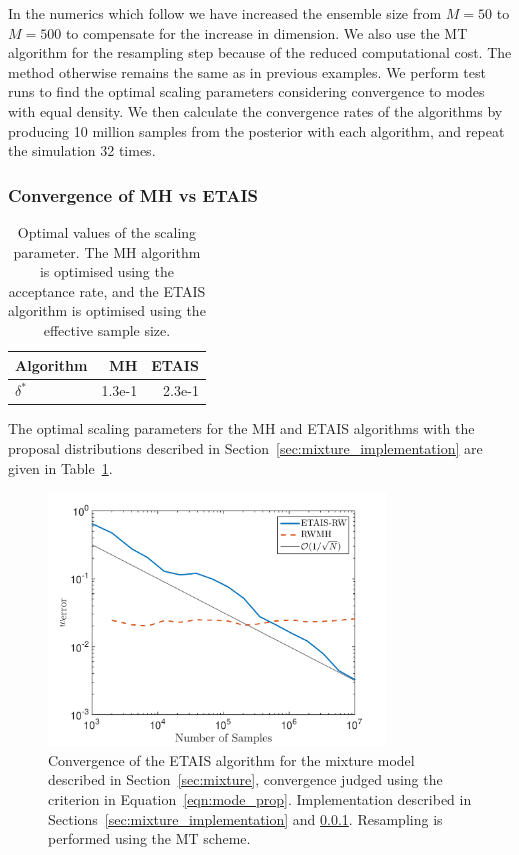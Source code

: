 \documentclass[final]{siamltex}
\begin{document}
In the numerics which follow we have increased the ensemble size from
$M=50$ to $M=500$ to compensate for the increase in dimension. We also
use the MT algorithm for the resampling step because of the reduced
computational cost. The method otherwise remains the same as in
previous examples. We perform test runs to find the optimal scaling
parameters considering convergence to modes with equal density. We
then calculate the convergence rates of the algorithms by producing 10
million samples from the posterior with each algorithm, and repeat the
simulation 32 times.

\subsubsection{Convergence of MH vs ETAIS}\label{sec:mixture_conv}

\begin{table}[!htb]
      \centering
        \begin{tabular}{|l|r|r|}
	\hline
	Algorithm	& MH & ETAIS \\ \hline
	$\delta^*$	& 1.3e-1     & 2.3e-1 \\
	\hline
	\end{tabular}
	\vspace{1mm}
	\caption{Optimal values of the scaling parameter. The MH algorithm is optimised using the acceptance rate, and the ETAIS algorithm is optimised using the effective sample size.}
	\label{table:mixture_opt_beta}
\end{table}

The optimal scaling parameters for the MH and ETAIS algorithms with the proposal distributions described in Section~\ref{sec:mixture_implementation} are given in Table~\ref{table:mixture_opt_beta}.

\begin{figure}[htb]
\centering
\includegraphics[width=0.8\textwidth]{"figures/Mode_proportions"}
\caption{Convergence of the ETAIS algorithm for the mixture model described in Section~\ref{sec:mixture}, convergence judged using the criterion in Equation~\eqref{eqn:mode_prop}. Implementation described in Sections~\ref{sec:mixture_implementation} and \ref{sec:mixture_conv}. Resampling is performed using the MT scheme.}
\label{fig:mixture_modes}
\end{figure}
\end{document}
